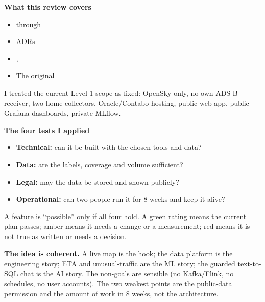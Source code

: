 \documentclass[10.5pt]{article}
\begin{document}
\begin{minipage}[t]{0.49\linewidth}
\begin{card}
{\bfseries What this review covers}
\begin{itemize}[leftmargin=1.1em,itemsep=1.5pt,topsep=2pt]
  \item {} through 
  \item ADRs --
  \item {}, 
  \item The original 
\end{itemize}
I treated the current Level 1 scope as fixed: OpenSky only, no own ADS-B receiver, two home collectors, Oracle/Contabo hosting, public web app, public Grafana dashboards, private MLflow.
\end{card}
\end{minipage}\hfill
\begin{minipage}[t]{0.49\linewidth}
\begin{card}
{\bfseries The four tests I applied}
\begin{itemize}[leftmargin=1.1em,itemsep=1.5pt,topsep=2pt]
  \item \textbf{Technical:} can it be built with the chosen tools and data?
  \item \textbf{Data:} are the labels, coverage and volume sufficient?
  \item \textbf{Legal:} may the data be stored and shown publicly?
  \item \textbf{Operational:} can two people run it for 8 weeks and keep it alive?
\end{itemize}
A feature is ``possible'' only if all four hold. A green rating means the current plan passes; amber means it needs a change or a measurement; red means it is not true as written or needs a decision.
\end{card}
\end{minipage}

\vspace{5pt}
\begin{softcard}
{\bfseries The idea is coherent.} A live map is the hook; the data platform is the engineering story; ETA and unusual-traffic are the ML story; the guarded text-to-SQL chat is the AI story. The non-goals are sensible (no Kafka/Flink, no schedules, no user accounts). The two weakest points are the public-data permission and the amount of work in 8 weeks, not the architecture.
\end{softcard}
\end{document}
